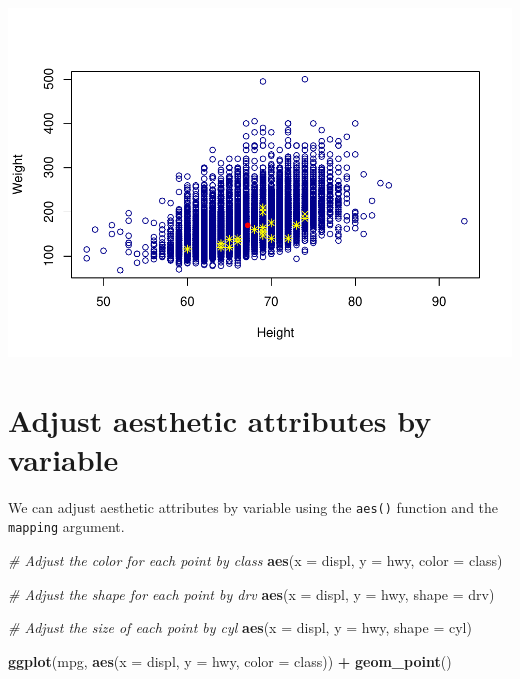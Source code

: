 \documentclass[
]{book}
\newenvironment{Shaded}{\begin{snugshade}}{\end{snugshade}}
\newcommand{\CommentTok}[1]{\textcolor[rgb]{0.56,0.35,0.01}{\textit{#1}}}
\newcommand{\DataTypeTok}[1]{\textcolor[rgb]{0.13,0.29,0.53}{#1}}
\newcommand{\KeywordTok}[1]{\textcolor[rgb]{0.13,0.29,0.53}{\textbf{#1}}}
\newcommand{\NormalTok}[1]{#1}
\newcommand{\OperatorTok}[1]{\textcolor[rgb]{0.81,0.36,0.00}{\textbf{#1}}}
\newcommand{\StringTok}[1]{\textcolor[rgb]{0.31,0.60,0.02}{#1}}
\begin{document}
\includegraphics{_main_files/figure-latex/unnamed-chunk-250-1.pdf}

\hypertarget{adjust-aesthetic-attributes-by-variable}{%
\section{Adjust aesthetic attributes by variable}\label{adjust-aesthetic-attributes-by-variable}}

We can adjust aesthetic attributes by variable using the \texttt{aes()} function and the \texttt{mapping} argument.

\begin{Shaded}
\begin{Highlighting}[]
\CommentTok{# Adjust the color for each point by class}
\KeywordTok{aes}\NormalTok{(}\DataTypeTok{x =}\NormalTok{ displ, }\DataTypeTok{y =}\NormalTok{ hwy, }\DataTypeTok{color =}\NormalTok{ class)}

\CommentTok{# Adjust the shape for each point by drv}
\KeywordTok{aes}\NormalTok{(}\DataTypeTok{x =}\NormalTok{ displ, }\DataTypeTok{y =}\NormalTok{ hwy, }\DataTypeTok{shape =}\NormalTok{ drv)}

\CommentTok{# Adjust the size of each point by cyl}
\KeywordTok{aes}\NormalTok{(}\DataTypeTok{x =}\NormalTok{ displ, }\DataTypeTok{y =}\NormalTok{ hwy, }\DataTypeTok{shape =}\NormalTok{ cyl)}
\end{Highlighting}
\end{Shaded}

\begin{Shaded}
\begin{Highlighting}[]
\KeywordTok{ggplot}\NormalTok{(mpg, }\KeywordTok{aes}\NormalTok{(}\DataTypeTok{x =}\NormalTok{ displ, }\DataTypeTok{y =}\NormalTok{ hwy, }\DataTypeTok{color =}\NormalTok{ class)) }\OperatorTok{+}\StringTok{ }\KeywordTok{geom_point}\NormalTok{()}
\end{Highlighting}
\end{Shaded}
\end{document}
